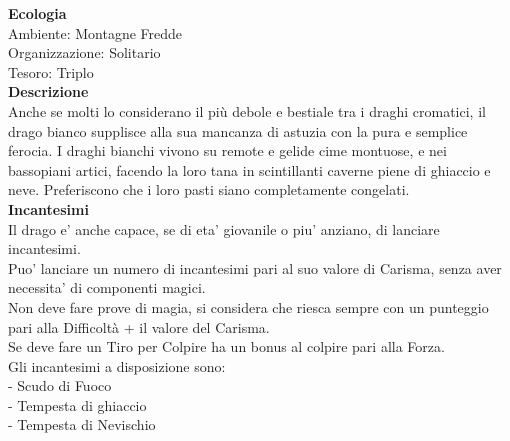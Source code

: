 \begin{multicols}{2}
\textbf{Ecologia}\\
Ambiente: Montagne Fredde\\
Organizzazione: Solitario\\
Tesoro: Triplo\\
\textbf{Descrizione}\\
Anche se molti lo considerano il più debole e bestiale tra i draghi cromatici, il drago bianco supplisce alla sua mancanza di astuzia con la pura e semplice ferocia. I draghi bianchi vivono su remote e gelide cime montuose, e nei bassopiani artici, facendo la loro tana in scintillanti caverne piene di ghiaccio e neve. Preferiscono che i loro pasti siano completamente congelati.\\
\textbf{Incantesimi}\\
Il drago e' anche capace, se di eta' giovanile o piu' anziano, di lanciare incantesimi.\\
Puo' lanciare un numero di incantesimi pari al suo valore di Carisma, senza aver necessita' di componenti magici.\\
Non deve fare prove di magia, si considera che riesca sempre con un punteggio pari alla Difficoltà + il valore del Carisma.\\
Se deve fare un Tiro per Colpire ha un bonus al colpire pari alla Forza.\\
Gli incantesimi a disposizione sono:\\
- Scudo di Fuoco\\
- Tempesta di ghiaccio\\
- Tempesta di Nevischio\\



\end{multicols}
